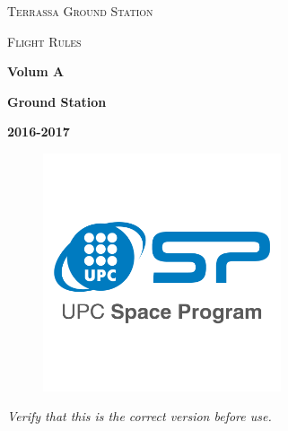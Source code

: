 \begin{titlepage}
	\begin{flushleft}
		\vspace{5cm}
		{\scshape\Huge Terrassa Ground Station\par}
		{\scshape\Huge Flight Rules\par}
		\vspace{4.5cm}
		{\huge\bfseries Volum A \par}
		\vspace{1cm}
		{\huge\bfseries Ground Station \par}
		{\LARGE\bfseries 2016-2017 \par}
		\vspace{6.5cm}
		\begin{figure}[H]
		    \includegraphics[height=7cm]{./img/upcsp.png} %
		\end{figure}
	\end{flushleft}
	\begin{center}
		{\itshape Verify that this is the correct version before use.\par}
	\end{center}
\end{titlepage}